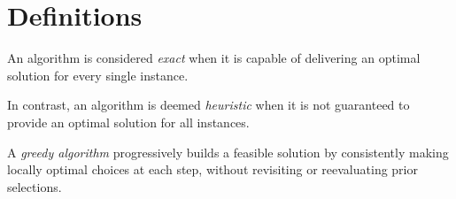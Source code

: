 \section{Definitions}

\begin{definition}
    An algorithm is considered \emph{exact} when it is capable of delivering an optimal solution for every single instance.

    In contrast, an algorithm is deemed \emph{heuristic} when it is not guaranteed to provide an optimal solution for all instances.

    A \emph{greedy algorithm} progressively builds a feasible solution by consistently making locally optimal choices at each step, without revisiting or reevaluating prior selections.
\end{definition}